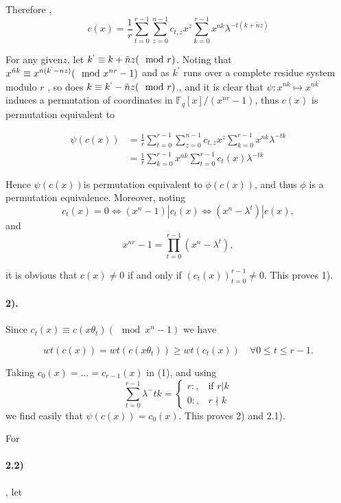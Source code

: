 \documentclass[fontsize=12pt]{article}
\begin{document}
Therefore ,
$$  c(x) = \frac{1}{r}  \sum_{t=0}^{r-1}\sum_{z=0}^{n-1} c_{t,z} x^z \sum_{k=0}^{r-1} x^{nk} \lambda^{-t(k+\tilde nz)}  $$

For any given$z$, let $k^{`} \equiv k +\tilde nz (\mod r )$. Noting that $x^{\tilde nk}\equiv 
x^{n(k^{`}-nz)} (\mod x^{nr}-1)$ and as $k^{'}$ runs over a complete residue
system modulo $r$ , so does $k \equiv k^{`} - \tilde nz (\mod r )$., and it is clear
that $\psi : x^{nk} \mapsto x^{nk^{'}}$
induces a permutation of coordinates in
$\mathbb{F}_q [x]/(x^{nr} -1)$, thus $c(x)$ is permutation equivalent to

\begin{equation}
\begin{split}
\psi(c(x)) &
=  \frac{1}{r}  \sum_{t=0}^{r-1}\sum_{z=0}^{n-1} c_{t,z} x^z \sum_{k=0}^{r-1} x^{nk} \lambda^{-tk}\\
& = \frac{1}{r}\sum_{k=0}^{r-1} x^{nk}   \sum_{t=0}^{r-1} c_{t}(x)  \lambda^{-tk}
\end{split}
\end{equation}

Hence $\psi(c(x)) $is permutation equivalent to $\phi(c(x))$, and thus
$\phi$ is a permutation equivalence. Moreover, noting
$$c_t (x) = 0 \iff (x^n − 1)|c_t (x) \iff (x^n − \lambda^t )|c(x),$$
and
$$   x^{nr} -1 =\prod_{t=0}^{r-1}(x^n - \lambda^t ),$$

it is obvious that $c(x) \neq 0$ if and only if $(c_t (x))^{r-1}
_{t=0}\neq 0.$ This
proves 1).

\paragraph{2).} Since $c_t (x) \equiv c(x\theta_t) (\mod {x^n - 1})$ we have 

$$   wt(c(x)) = wt(c(x\theta_t)) \geq wt(c_t (x))\,\,\,\,\,\, \forall 0\leq t \leq r-1.$$

Taking $c_0(x) = ... = c_{r-1}(x)$ in (1), and using
\begin{equation*}
\sum_{t=0}^{r-1}\lambda^-{tk}= 
\begin{cases}
    r:,& \text{if } r|k\\
    0:,              & r\nmid k
\end{cases}
\end{equation*}
we find easily that $\psi(c(x)) = c_0(x)$. This proves 2) and 2.1).

For \paragraph{2.2)}, let
\end{document}
